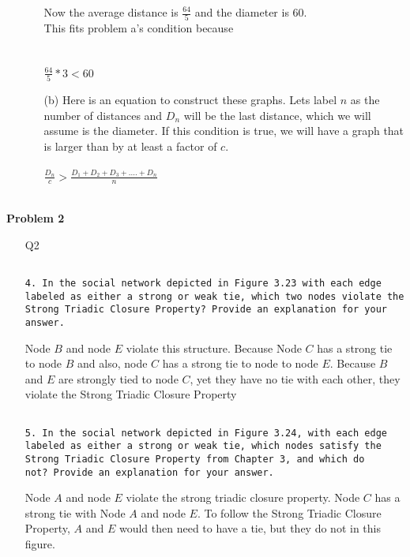 \documentclass[ruled]{article}
\begin{document}
\begin{itemize}
\begin{itemize}
Now the average distance is $\frac{64}{5}$ and the diameter is $60$.  
\\ 
This fits problem a's condition because \\ \\ \\
{\LARGE $\frac{64}{5} * 3 < 60$ }
\\
\item[(b)]  Here is an equation to construct these graphs.  Lets label $n$ as the number of distances and $D_n$ will be the last distance, which we will assume is the diameter.  If this condition is true, we will have a graph that is larger than by at least a factor of $c$.
\\
\\
{\LARGE $\frac{D_n}{c} > \frac{D_1 + D_2 + D_3 + .... + D_n}{n}$ }
\\\\
\end{itemize}
\end{itemize}

\textbf{Problem 2}
\begin{itemize}
\item[Q2]
\begin{verbatim}

4. In the social network depicted in Figure 3.23 with each edge
labeled as either a strong or weak tie, which two nodes violate the
Strong Triadic Closure Property? Provide an explanation for your
answer.

\end{verbatim}
Node $B$ and node $E$ violate this structure.  Because Node $C$ has a strong tie to node $B$ and also, node $C$ has a strong tie to node to node $E$.  Because $B$ and $E$ are strongly tied to node $C$, yet they have no tie with each other, they violate the Strong Triadic Closure Property
\\ 
\begin{verbatim}

5. In the social network depicted in Figure 3.24, with each edge
labeled as either a strong or weak tie, which nodes satisfy the
Strong Triadic Closure Property from Chapter 3, and which do
not? Provide an explanation for your answer.

\end{verbatim}
Node $A$ and node $E$ violate the strong triadic closure property.  Node $C$ has a strong tie with Node $A$ and node $E$.  To follow the Strong Triadic Closure Property, $A$ and $E$ would then need to have a tie, but they do not in this figure.
\end{itemize}
\end{document}
